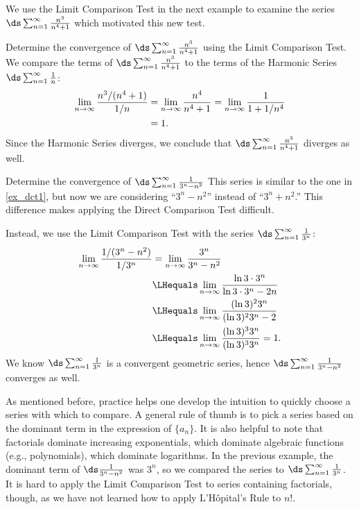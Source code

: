 We use the Limit Comparison Test in the next example to examine the series $\ds\sum_{n=1}^\infty \frac{n^3}{n^4+1}$ which motivated this new test.

\begin{example}\label{ex_lct1}
Determine the convergence of $\ds\sum_{n=1}^\infty \frac{n^3}{n^4+1}$ using the Limit Comparison Test.
\solution
We compare the terms of $\ds\sum_{n=1}^\infty \frac{n^3}{n^4+1}$ to the terms of the Harmonic Series $\ds\sum_{n=1}^\infty \frac1{n}$:
\begin{align*}
	\lim_{n\to\infty}\frac{{n^3}/(n^4+1)}{1/n}
	&= \lim_{n\to\infty} \frac{n^4}{n^4+1}= \lim_{n\to\infty} \frac{1}{1+1/n^4} \\
	&= 1.\vspace{-.5\baselineskip}
\end{align*}
Since the Harmonic Series diverges, we conclude that $\ds\sum_{n=1}^\infty \frac{n^3}{n^4+1}$ diverges as well.
\end{example}

\begin{example}\label{ex_lct2}
Determine the convergence of $\ds\sum_{n=1}^\infty \frac1{3^n-n^2}$
\solution
This series is similar to the one in \autoref{ex_dct1}, but now we are considering ``$3^n-n^2$'' instead of ``$3^n+n^2$.'' This difference makes applying the Direct Comparison Test difficult.

Instead, we use the Limit Comparison Test %
with the series $\ds\sum_{n=1}^\infty \frac1{3^n}$:
\begin{align*}
	\lim_{n\to\infty}\frac{1/(3^n-n^2)}{1/3^n}
	&= \lim_{n\to\infty}\frac{3^n}{3^n-n^2} \\
	& \LHequals \lim_{n\to\infty} \frac{\ln 3 \cdot 3^n}{\ln 3 \cdot 3^n -2n}\\
	& \LHequals \lim_{n\to\infty} \frac {(\ln 3)^2 3^n}{(\ln 3)^2 3^n -2}\\
	& \LHequals \lim_{n\to\infty} \frac {(\ln 3)^3 3^n}{(\ln 3)^3 3^n}=1.
\end{align*}
We know $\ds\sum_{n=1}^\infty \frac1{3^n}$ is a convergent geometric series, hence $\ds\sum_{n=1}^\infty \frac1{3^n-n^2}$ converges as well.
\end{example}

As mentioned before, practice helps one develop the intuition to quickly choose a series with which to compare. A general rule of thumb is to pick a series based on the dominant term in the expression of $\{a_n\}$. It is also helpful to note that factorials dominate increasing exponentials, which dominate algebraic functions (e.g., polynomials), which dominate logarithms. In the previous example, the dominant term of $\ds\frac{1}{3^n-n^2}$ was $3^n$, so we compared the series to $\ds \sum_{n=1}^\infty \frac1{3^n}$. It is hard to apply the Limit Comparison Test to series containing factorials, though, as we have not learned how to apply L'Hôpital's Rule to $n!$.

